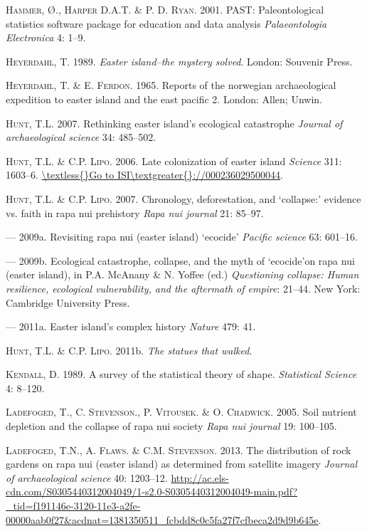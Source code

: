 \documentclass[]{article}
\begin{document}
\textsc{Hammer}, {Ø}., \textsc{Harper} D.A.T. \& \textsc{P. D. Ryan}.
2001. PAST: Paleontological statistics software package for education
and data analysis \emph{Palaeontologia Electronica} 4: 1--9.

\textsc{Heyerdahl}, T. 1989. \emph{Easter island--the mystery solved}.
London: Souvenir Press.

\textsc{Heyerdahl}, T. \& E. \textsc{Ferdon}. 1965. Reports of the
norwegian archaeological expedition to easter island and the east
pacific 2. London: Allen; Unwin.

\textsc{Hunt}, T.L. 2007. Rethinking easter island's ecological
catastrophe \emph{Journal of archaeological science} 34: 485--502.

\textsc{Hunt}, T.L. \& C.P. \textsc{Lipo}. 2006. Late colonization of
easter island \emph{Science} 311: 1603--6.
\url{\textless{}Go to ISI\textgreater{}://000236029500044}.

\textsc{Hunt}, T.L. \& C.P. \textsc{Lipo}. 2007. Chronology,
deforestation, and `collapse:' evidence vs. faith in rapa nui prehistory
\emph{Rapa nui journal} 21: 85--97.

--- 2009a. Revisiting rapa nui (easter island) `ecocide' \emph{Pacific
science} 63: 601--16.

--- 2009b. Ecological catastrophe, collapse, and the myth of `ecocide'on
rapa nui (easter island), in P.A. McAnany \& N. Yoffee (ed.)
\emph{Questioning collapse: Human resilience, ecological vulnerability,
and the aftermath of empire}: 21--44. New York: Cambridge University
Press.

--- 2011a. Easter island's complex history \emph{Nature} 479: 41.

\textsc{Hunt}, T.L. \& C.P. \textsc{Lipo}. 2011b. \emph{The statues that
walked}.

\textsc{Kendall}, D. 1989. A survey of the statistical theory of shape.
\emph{Statistical Science} 4: 8--120.

\textsc{Ladefoged}, T., C. \textsc{Stevenson}., P. \textsc{Vitousek}. \&
O. \textsc{Chadwick}. 2005. Soil nutrient depletion and the collapse of
rapa nui society \emph{Rapa nui journal} 19: 100--105.

\textsc{Ladefoged}, T.N., A. \textsc{Flaws}. \& C.M. \textsc{Stevenson}.
2013. The distribution of rock gardens on rapa nui (easter island) as
determined from satellite imagery \emph{Journal of archaeological
science} 40: 1203--12.
\url{http://ac.els-cdn.com/S0305440312004049/1-s2.0-S0305440312004049-main.pdf?_tid=f191146e-3120-11e3-a2fe-00000aab0f27\&acdnat=1381350511_fcbdd8c0c5fa27f7cfbeca2d9d9b645e}.
\end{document}
